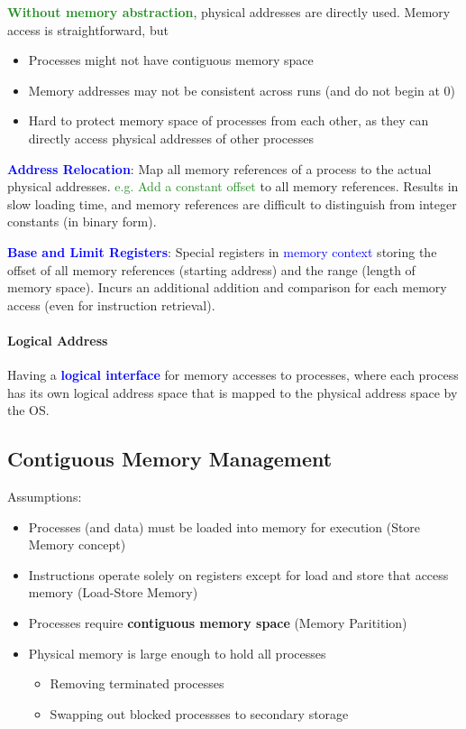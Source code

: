 \textcolor{ForestGreen}{\textbf{Without memory abstraction}}, physical
addresses are directly used. Memory access is straightforward, but
\begin{itemize}
  \item Processes might not have \textcolor{Bittersweet}{contiguous memory
    space}
  \item Memory addresses may not be \textcolor{Bittersweet}{consistent across
    runs} (and do not begin at 0)
  \item \textcolor{Bittersweet}{Hard to protect memory space} of processes from
    each other, as they can directly access physical addresses of other
    processes
\end{itemize}
\textbf{\textcolor{Blue}{Address Relocation}}: Map all memory references of a
process to the actual physical addresses. \textcolor{ForestGreen}{e.g. Add a
constant offset} to all memory references. Results in
\textcolor{Bittersweet}{slow loading time}, and memory references are
\textcolor{Bittersweet}{difficult to distinguish} from integer constants (in
binary form).

\textbf{\textcolor{Blue}{Base and Limit Registers}}: Special registers in
\textcolor{Blue}{memory context} storing the offset of all memory references
(starting address) and the range (length of memory space). Incurs an
\textcolor{Bittersweet}{additional addition and comparison} for each memory
access (even for instruction retrieval).

\paragraph{Logical Address}
Having a \textbf{\textcolor{Blue}{logical interface}} for memory accesses to
processes, where each process has its own \textcolor{Bittersweet}{logical
address space that is mapped to the physical address space} by the OS.

\subsection{Contiguous Memory Management}
Assumptions:
\begin{itemize}
  \item Processes (and data) must be loaded into memory for execution
    (\textcolor{Bittersweet}{Store Memory concept})
  \item Instructions operate solely on registers except for load and store that
    access memory (\textcolor{Bittersweet}{Load-Store Memory})
  \item Processes require \textbf{contiguous memory space} (Memory Paritition)
  \item Physical memory is \textcolor{Bittersweet}{large enough} to hold all processes
    \begin{itemize}
      \item Removing terminated processes
      \item Swapping out blocked processses to secondary storage
    \end{itemize}
\end{itemize}

